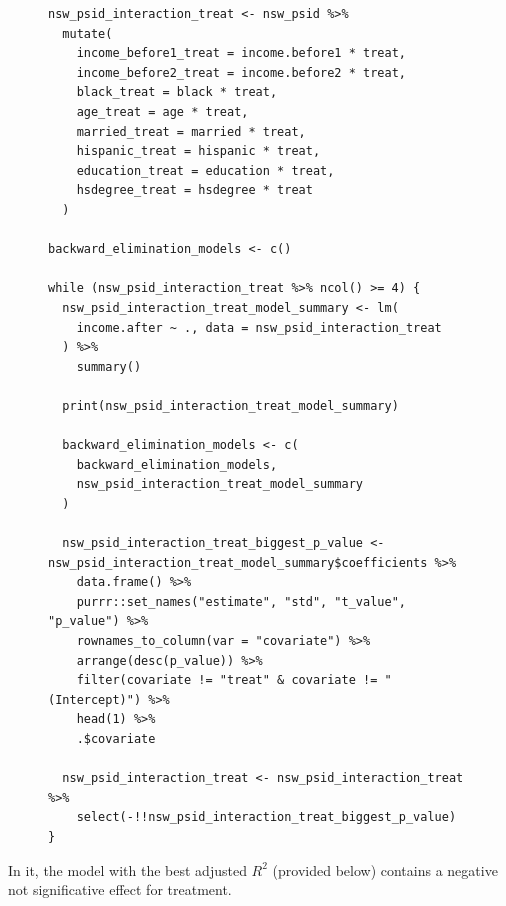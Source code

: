 \documentclass{article}
\begin{document}
\begin{figure}[H]
\centering
\begin{lstlisting}[style=Rstyle, caption=Backpropagation Code]
nsw_psid_interaction_treat <- nsw_psid %>% 
  mutate(
    income_before1_treat = income.before1 * treat,
    income_before2_treat = income.before2 * treat,
    black_treat = black * treat,
    age_treat = age * treat,
    married_treat = married * treat,
    hispanic_treat = hispanic * treat,
    education_treat = education * treat,
    hsdegree_treat = hsdegree * treat
  )

backward_elimination_models <- c()

while (nsw_psid_interaction_treat %>% ncol() >= 4) {
  nsw_psid_interaction_treat_model_summary <- lm(
    income.after ~ ., data = nsw_psid_interaction_treat
  ) %>% 
    summary()
  
  print(nsw_psid_interaction_treat_model_summary)
  
  backward_elimination_models <- c(
    backward_elimination_models,
    nsw_psid_interaction_treat_model_summary
  )
  
  nsw_psid_interaction_treat_biggest_p_value <- nsw_psid_interaction_treat_model_summary$coefficients %>%
    data.frame() %>% 
    purrr::set_names("estimate", "std", "t_value", "p_value") %>% 
    rownames_to_column(var = "covariate") %>% 
    arrange(desc(p_value)) %>% 
    filter(covariate != "treat" & covariate != "(Intercept)") %>% 
    head(1) %>% 
    .$covariate
  
  nsw_psid_interaction_treat <- nsw_psid_interaction_treat %>% 
    select(-!!nsw_psid_interaction_treat_biggest_p_value)
}
\end{lstlisting}
\end{figure}

In it, the model with the best adjusted $R^2$ (provided below) contains a negative not significative effect for treatment.
\end{document}
